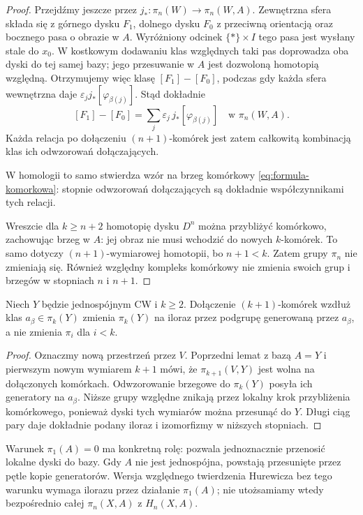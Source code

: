 \begin{proof}
Przejdźmy jeszcze przez $j_*:\pi_n(W)\to\pi_n(W,A)$.
Zewnętrzna sfera składa się z górnego dysku $F_1$,
dolnego dysku $F_0$ z przeciwną orientacją oraz bocznego
pasa o obrazie w $A$. Wyróżniony odcinek $\{*\}\times I$
tego pasa jest wysłany stale do $x_0$.
W kostkowym dodawaniu klas względnych taki pas doprowadza
oba dyski do tej samej bazy; jego przesuwanie w $A$ jest
dozwoloną homotopią względną. Otrzymujemy więc klasę
$[F_1]-[F_0]$, podczas gdy każda sfera wewnętrzna daje
$\varepsilon_jj_*[\varphi_{\beta(j)}]$. Stąd dokładnie
\[
 [F_1]-[F_0]
 =\sum_j\varepsilon_j\,j_*[\varphi_{\beta(j)}]
 \quad\text{w }\pi_n(W,A).
\]
Każda relacja po dołączeniu $(n+1)$-komórek jest zatem
całkowitą kombinacją klas ich odwzorowań dołączających.

W homologii to samo
stwierdza wzór
na brzeg komórkowy
\eqref{eq:formula-komorkowa}:
stopnie odwzorowań dołączających
są dokładnie
współczynnikami
tych relacji.

Wreszcie dla $k\geq n+2$
homotopię dysku $D^n$
można przybliżyć
komórkowo, zachowując
brzeg w $A$: jej obraz
nie musi wchodzić
do nowych $k$-komórek.
To samo dotyczy
$(n+1)$-wymiarowej
homotopii, bo $n+1<k$.
Zatem grupy $\pi_n$
nie zmieniają się.
Również względny
kompleks komórkowy
nie zmienia swoich
grup i brzegów
w stopniach $n$ i $n+1$.
\end{proof}

\begin{wniosek}
\label{cor:zabijanie-klas-pi}
Niech $Y$ będzie jednospójnym CW i $k\geq2$.
Dołączenie $(k+1)$-komórek wzdłuż klas $a_\beta\in\pi_k(Y)$
zmienia $\pi_k(Y)$ na iloraz przez podgrupę generowaną przez $a_\beta$,
a nie zmienia $\pi_i$ dla $i<k$.
\end{wniosek}
\begin{proof}
Oznaczmy nową przestrzeń przez $V$. Poprzedni lemat z bazą $A=Y$
i pierwszym nowym wymiarem $k+1$ mówi, że
$\pi_{k+1}(V,Y)$ jest wolna na dołączonych komórkach.
Odwzorowanie brzegowe do $\pi_k(Y)$ posyła ich generatory na $a_\beta$.
Niższe grupy względne znikają przez lokalny krok przybliżenia
komórkowego, ponieważ dyski tych wymiarów można przesunąć do $Y$.
Długi ciąg pary daje dokładnie podany iloraz i izomorfizmy w niższych stopniach.
\end{proof}

\begin{uwaga}
Warunek $\pi_1(A)=0$ ma
konkretną rolę: pozwala
jednoznacznie przenosić
lokalne dyski do bazy.
Gdy $A$ nie jest
jednospójna, powstają
przesunięte przez pętle
kopie generatorów.
Wersja względnego
twierdzenia Hurewicza
bez tego warunku
wymaga ilorazu przez
działanie $\pi_1(A)$;
nie utożsamiamy wtedy
bezpośrednio całej
$\pi_n(X,A)$ z
$H_n(X,A)$.
\end{uwaga}


